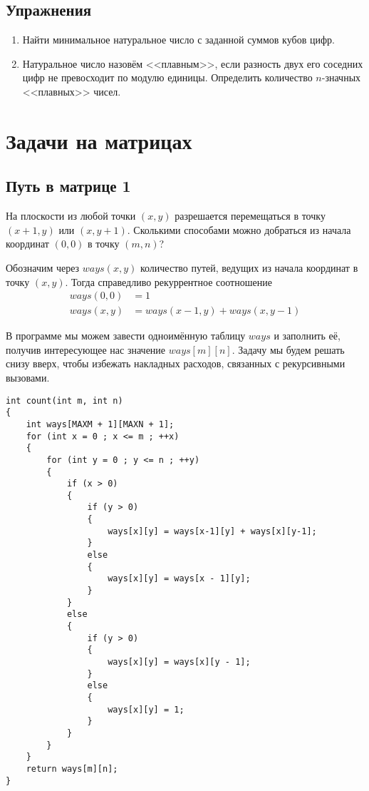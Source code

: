 \documentclass[14pt,openany]{book}
\begin{document}
\section{Упражнения}

\begin{enumerate}

\item Найти минимальное натуральное число с заданной суммов кубов цифр.

\item Натуральное число назовём <<плавным>>, если разность двух его соседних цифр не превосходит
      по модулю единицы. Определить количество $n$-значных <<плавных>> чисел.

\end{enumerate}

\chapter{Задачи на матрицах}

\section{Путь в матрице 1}

На плоскости из любой точки $(x, y)$ разрешается перемещаться в точку $(x+1,y)$ или $(x,y+1)$.
Сколькими способами можно добраться из начала координат $(0,0)$ в точку $(m,n)$?

Обозначим через $ways(x,y)$ количество путей, ведущих из начала координат в точку $(x,y)$.
Тогда справедливо рекуррентное соотношение
\begin{align*}
ways(0,0) &= 1 \\
ways(x,y) &= ways(x-1,y) + ways(x,y-1)
\end{align*}

В программе мы можем завести одноимённую таблицу $ways$ и заполнить её, получив интересующее
нас значение $ways[m][n]$. Задачу мы будем решать снизу вверх, чтобы избежать накладных
расходов, связанных с рекурсивными вызовами.

\begin{lstlisting}
int count(int m, int n)
{
    int ways[MAXM + 1][MAXN + 1];
    for (int x = 0 ; x <= m ; ++x)
    {
        for (int y = 0 ; y <= n ; ++y)
        {
            if (x > 0)
            {
                if (y > 0)
	            {
                    ways[x][y] = ways[x-1][y] + ways[x][y-1];
	            }
                else
                {
                    ways[x][y] = ways[x - 1][y];
                }
            }
            else
            {
                if (y > 0)
                {
                    ways[x][y] = ways[x][y - 1];
                }
                else
                {
                    ways[x][y] = 1;
                }
            }
        }
    }
    return ways[m][n];
}
\end{lstlisting}
\end{document}
